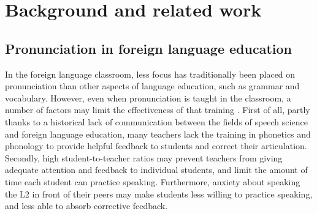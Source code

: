 %
%
\chapter{Background and related work}
\label{chap:background}



	\section{Pronunciation in foreign language education}
	\label{sec:capt:l2ed}
%	


In the foreign language classroom, less focus has traditionally been placed on pronunciation than other aspects of language education, such as grammar and vocabulary. %
However, even when pronunciation is taught in the classroom, a number of factors may limit the effectiveness of that training \citep{Neri2002,Derwing2005}. First of all, partly thanks to a historical lack of communication between the fields of speech science and foreign language education, many teachers lack the training in phonetics and phonology to provide helpful feedback to students and correct their articulation. Secondly, high student-to-teacher ratios may prevent teachers from giving adequate attention and feedback to individual students, and limit the amount of time each student can practice speaking. Furthermore, anxiety about speaking the L2 in front of their peers may make students less willing to practice speaking, and less able to absorb corrective feedback. 




